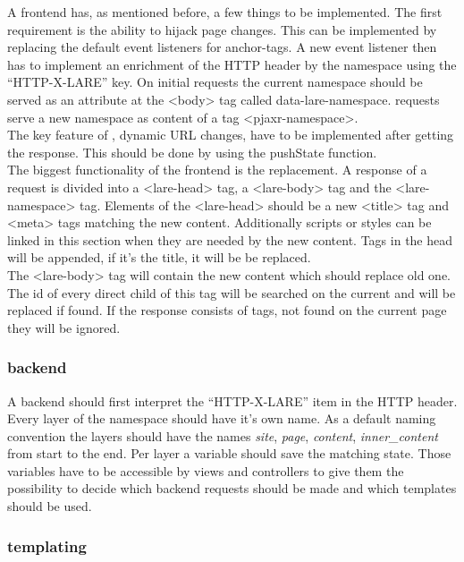 A \lare{} frontend has, as mentioned before, a few things to be implemented.
The first requirement is the ability to hijack page changes.
This can be implemented by replacing the default event listeners for anchor-tags.
A new event listener then has to implement an enrichment of the HTTP header by the namespace using the \enquote{HTTP-X-LARE} key.
On initial requests the current namespace should be served as an attribute at the <body> tag called data-lare-namespace.
\lare{} requests serve a new namespace as content of a tag <pjaxr-namespace>.
\\
The key feature of \lare{}, dynamic URL changes, have to be implemented after getting the response.
This should be done by using the pushState function.
\\
The biggest functionality of the \lare{} frontend is the replacement.
A response of a \lare{} request is divided into a <lare-head> tag, a <lare-body> tag and the <lare-namespace> tag.
Elements of the <lare-head> should be a new <title> tag and <meta> tags matching the new content. 
Additionally scripts or styles can be linked in this section when they are needed by the new content.
Tags in the head will be appended, if it's the title, it will be be replaced.
\\
The <lare-body> tag will contain the new content which should replace old one.
The id of every direct child of this tag will be searched on the current \webPage{} and will be replaced if found.
If the response consists of tags, not found on the current page they will be ignored.

\subsubsection{\lare{} backend\label{sec:lare_backend}}

A \lare{} backend should first interpret the \enquote{HTTP-X-LARE} item in the HTTP header.
Every layer of the namespace should have it's own name.
As a default naming convention the layers should have the names \emph{site}, \emph{page}, \emph{content}, \emph{inner\_content} from start to the end.
Per layer a variable should save the matching state.
Those variables have to be accessible by views and controllers to give them the possibility to decide which backend requests should be made and which templates should be used.

\subsubsection{\lare{} templating\label{sec:lare_templating}}

